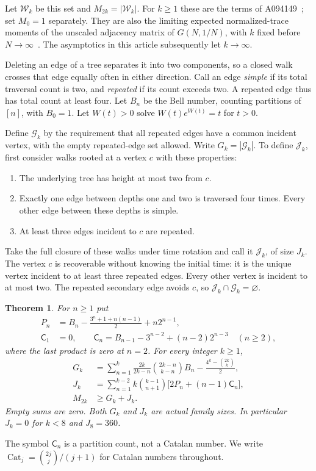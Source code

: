 \documentclass[11pt,letterpaper]{article}
\newtheorem{theorem}{Theorem}[section]
\theoremstyle{remark}\newtheorem{remark}[theorem]{Remark}
\newcommand{\Wc}{\mathcal W}\newcommand{\Uc}{\mathcal U}\newcommand{\Part}{\operatorname{Part}}
\newcommand{\Cat}{\operatorname{Cat}}\newcommand{\E}{\mathbb E}\newcommand{\Prob}{\mathbb P}\newcommand{\ind}{\mathbf 1}
\newcommand{\Gc}{\mathcal G}\newcommand{\Hc}{\mathcal H}\newcommand{\Jc}{\mathcal J}
\newcommand{\Cgood}{\mathsf C}\DeclareMathOperator{\norm}{norm}
\theoremstyle{definition}\newtheorem{definition}[theorem]{Definition}
\begin{document}
Let $\Wc_k$ be this set and $M_{2k}=|\Wc_k|$. For $k\ge1$ these are the terms of A094149~\cite{oeis}; set $M_0=1$ separately. They are also the limiting expected normalized-trace moments of the unscaled adjacency matrix of $G(N,1/N)$, with $k$ fixed before $N\to\infty$~\cite{bg}. The asymptotics in this article subsequently let $k\to\infty$.

Deleting an edge of a tree separates it into two components, so a closed walk crosses that edge equally often in either direction. Call an edge \emph{simple} if its total traversal count is two, and \emph{repeated} if its count exceeds two. A repeated edge thus has total count at least four. Let $B_n$ be the Bell number, counting partitions of $[n]$, with $B_0=1$. Let $W(t)>0$ solve $W(t)e^{W(t)}=t$ for $t>0$.

Define $\Gc_k$ by the requirement that all repeated edges have a common incident vertex, with the empty repeated-edge set allowed. Write $G_k=|\Gc_k|$. To define $\Jc_k$, first consider walks rooted at a vertex $c$ with these properties:
\begin{enumerate}
\item The underlying tree has height at most two from $c$.
\item Exactly one edge between depths one and two is traversed four times. Every other edge between these depths is simple.
\item At least three edges incident to $c$ are repeated.
\end{enumerate}
Take the full closure of these walks under time rotation and call it $\Jc_k$, of size $J_k$. The vertex $c$ is recoverable without knowing the initial time: it is the unique vertex incident to at least three repeated edges. Every other vertex is incident to at most two. The repeated secondary edge avoids $c$, so $\Jc_k\cap\Gc_k=\varnothing$.

\begin{theorem}\label{sgm:lw:thm:exact}
For $n\ge1$ put
\begin{align}
 P_n&=B_n-\frac{3^n+1+n(n-1)}2+n2^{n-1},\label{sgm:lw:eq:P}\\
 \Cgood_1&=0,\qquad
 \Cgood_n=B_{n-1}-3^{n-2}+(n-2)2^{n-3}\quad(n\ge2),\label{sgm:lw:eq:Cgood}
\end{align}
where the last product is zero at $n=2$. For every integer $k\ge1$,
\begin{align}
 G_k&=\sum_{n=1}^{k}\frac{2k}{2k-n}\binom{2k-n}{k-n}B_n
       -\frac{4^k-\binom{2k}{k}}2,\label{sgm:lw:eq:G}\\
 J_k&=\sum_{n=1}^{k-2}k\binom{k-1}{n+1}
                 \bigl[2P_n+(n-1)\Cgood_n\bigr],\label{sgm:lw:eq:J}\\
 M_{2k}&\ge G_k+J_k.\label{sgm:lw:eq:main}
\end{align}
Empty sums are zero. Both $G_k$ and $J_k$ are actual family sizes. In particular $J_k=0$ for $k<8$ and $J_8=360$.
\end{theorem}
The symbol $\Cgood_n$ is a partition count, not a Catalan number. We write $\Cat_j=\binom{2j}{j}/(j+1)$ for Catalan numbers throughout.
\end{document}
